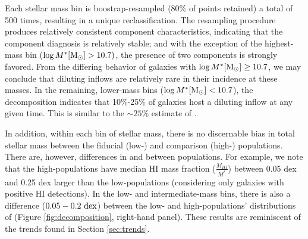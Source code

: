 Each stellar mass bin is boostrap-resampled (80\% of points retained) a total of 500 times, resulting in a unique reclassification. The resampling procedure produces relatively consistent component characteristics, indicating that the component diagnosis is relatively stable; and with the exception of the highest-mass bin ($\log M^* {\rm [M_{\odot}]} > 10.7)$, the presence of two components is strongly favored. From the differing behavior of galaxies with $\log M^* {\rm [M_{\odot}]} \ge 10.7$, we may conclude that diluting inflows are relatively rare in their incidence at these masses. In the remaining, lower-mass bins ($\log M^* {\rm [M_{\odot}]} < 10.7$), the decomposition indicates that 10\%-25\% of galaxies host a diluting inflow at any given time. This is similar to the $\sim 25\%$ estimate of \citet{hwang_2019_manga_almrs}. 

In addition, within each bin of stellar mass, there is no discernable bias in total stellar mass between the fiducial (low-\metdisp) and comparison (high-\metdisp) populations. There are, however, differences in \metdec and \hifrac between populations. For example, we note that the high-\metdisp populations have median HI mass fraction ($\frac{M_{HI}}{M^*}$) between 0.05 dex and 0.25 dex larger than the low-\metdisp populations (considering only galaxies with positive HI detections). In the low- and intermediate-mass bins, there is also a difference ($0.05-0.2 ~ {\rm dex}$) between the low- and high-\metdisp populations' distributions of \metdec (Figure \ref{fig:decomposition}, right-hand panel). These results are reminiscent of the trends found in Section \ref{sec:trends}.

